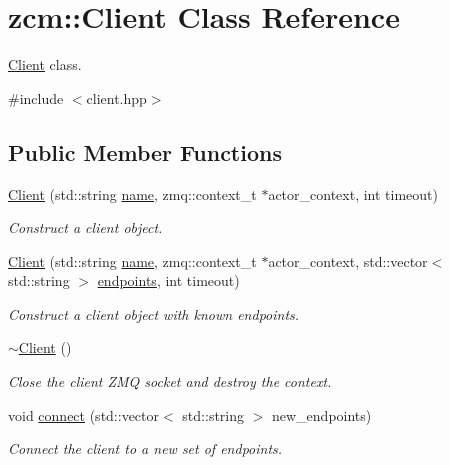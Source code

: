 \hypertarget{classzcm_1_1Client}{\section{zcm\-:\-:Client Class Reference}
\label{classzcm_1_1Client}
}


\hyperlink{classzcm_1_1Client}{Client} class.  




{\ttfamily \#include $<$client.\-hpp$>$}

\subsection*{Public Member Functions}
\begin{DoxyCompactItemize}
\item 
\hyperlink{classzcm_1_1Client_aeea4b7db3574a527009edc3f41310bcc}{Client} (std\-::string \hyperlink{classzcm_1_1Client_ae972b951134774fd2246d802e2bc6fc0}{name}, zmq\-::context\-\_\-t $\ast$actor\-\_\-context, int timeout)
\begin{DoxyCompactList}\small\item\em Construct a client object. \end{DoxyCompactList}\item 
\hyperlink{classzcm_1_1Client_a6002478c33c7c876de6b1b001121ff87}{Client} (std\-::string \hyperlink{classzcm_1_1Client_ae972b951134774fd2246d802e2bc6fc0}{name}, zmq\-::context\-\_\-t $\ast$actor\-\_\-context, std\-::vector$<$ std\-::string $>$ \hyperlink{classzcm_1_1Client_a01cfee292bb3546a47ec70fff35ff1b6}{endpoints}, int timeout)
\begin{DoxyCompactList}\small\item\em Construct a client object with known endpoints. \end{DoxyCompactList}\item 
\hyperlink{classzcm_1_1Client_a927b35854850369d4d95b3101f3a9baa}{$\sim$\-Client} ()
\begin{DoxyCompactList}\small\item\em Close the client Z\-M\-Q socket and destroy the context. \end{DoxyCompactList}\item 
void \hyperlink{classzcm_1_1Client_aabf03e1bc961b1e525cff57986b1b5a8}{connect} (std\-::vector$<$ std\-::string $>$ new\-\_\-endpoints)
\begin{DoxyCompactList}\small\item\em Connect the client to a new set of endpoints. \end{DoxyCompactList}\item 

\end{DoxyCompactItemize}
